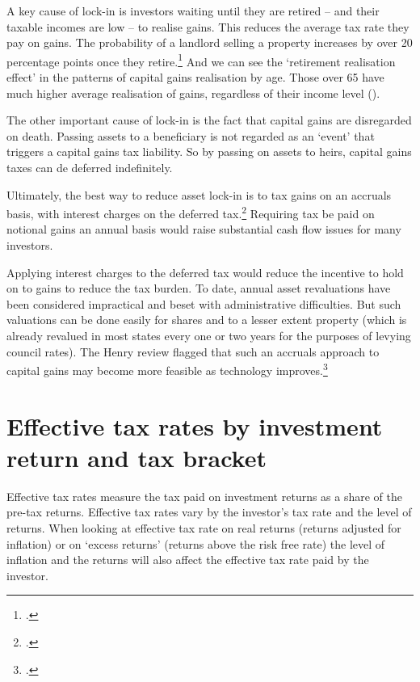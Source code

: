 \begin{subappendices}
A key cause of lock-in is investors waiting until they are retired – and their taxable incomes are low – to realise gains. This reduces the average tax rate they pay on gains. The probability of a landlord selling a property increases by over 20 percentage points once they retire.\footcite{WoodOng2010}  And we can see the ‘retirement realisation effect’ in the patterns of capital gains realisation by age. Those over 65 have much higher average realisation of gains, regardless of their income level (). 

The other important cause of lock-in is the fact that capital gains are disregarded on death. Passing assets to a beneficiary is not regarded as an ‘event’ that triggers a capital gains tax liability. So by passing on assets to heirs, capital gains taxes can de deferred indefinitely. 

Ultimately, the best way to reduce asset lock-in is to tax gains on an accruals basis, with interest charges on the deferred tax.\footcites[][11--14]{Burman2009}[][12]{Ingles2009a}  Requiring tax be paid on notional gains an annual basis would raise substantial cash flow issues for many investors. 

Applying interest charges to the deferred tax would reduce the incentive to hold on to gains to reduce the tax burden. To date, annual asset revaluations have been considered impractical and beset with administrative difficulties.  But such valuations can be done easily for shares and to a lesser extent property (which is already revalued in most states every one or two years for the purposes of levying council rates).  The Henry review flagged that such an accruals approach to capital gains may become more feasible as technology improves.\footcite[][64]{HenryTaxReview2010} 


\cleardoubleevenstandardpage
\chapter{Effective tax rates by investment return and tax bracket}\label{appendix:EMTRs}
Effective tax rates measure the tax paid on investment returns as a share of the pre-tax returns. Effective tax rates vary by the investor’s tax rate and the level of returns. When looking at effective tax rate on real returns (returns adjusted for inflation) or on `excess returns' (returns above the risk free rate) the level of inflation and the returns will also affect the effective tax rate paid by the investor. 


\end{subappendices}
